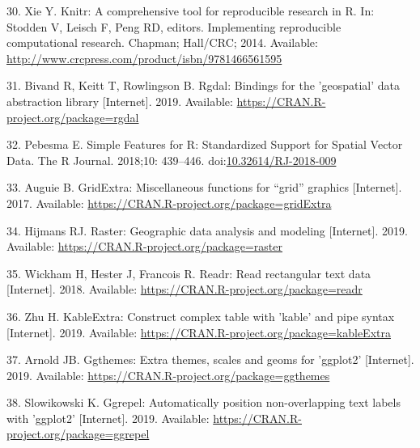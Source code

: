 \documentclass[10pt,letterpaper]{article}
\begin{document}
\hypertarget{ref-Xie2014knitr}{}
30. Xie Y. Knitr: A comprehensive tool for reproducible research in R.
In: Stodden V, Leisch F, Peng RD, editors. Implementing reproducible
computational research. Chapman; Hall/CRC; 2014. Available:
\url{http://www.crcpress.com/product/isbn/9781466561595}

\hypertarget{ref-Bivand2019rgdal}{}
31. Bivand R, Keitt T, Rowlingson B. Rgdal: Bindings for the
'geospatial' data abstraction library {[}Internet{]}. 2019. Available:
\url{https://CRAN.R-project.org/package=rgdal}

\hypertarget{ref-Pebesma2018sf}{}
32. Pebesma E. Simple Features for R: Standardized Support for Spatial
Vector Data. The R Journal. 2018;10: 439--446.
doi:\href{https://doi.org/10.32614/RJ-2018-009}{10.32614/RJ-2018-009}

\hypertarget{ref-Auguie2017grid}{}
33. Auguie B. GridExtra: Miscellaneous functions for ``grid'' graphics
{[}Internet{]}. 2017. Available:
\url{https://CRAN.R-project.org/package=gridExtra}

\hypertarget{ref-Hijmans2019raster}{}
34. Hijmans RJ. Raster: Geographic data analysis and modeling
{[}Internet{]}. 2019. Available:
\url{https://CRAN.R-project.org/package=raster}

\hypertarget{ref-Wickham2018readr}{}
35. Wickham H, Hester J, Francois R. Readr: Read rectangular text data
{[}Internet{]}. 2018. Available:
\url{https://CRAN.R-project.org/package=readr}

\hypertarget{ref-Zhu2019kable}{}
36. Zhu H. KableExtra: Construct complex table with 'kable' and pipe
syntax {[}Internet{]}. 2019. Available:
\url{https://CRAN.R-project.org/package=kableExtra}

\hypertarget{ref-Arnold2019ggthemes}{}
37. Arnold JB. Ggthemes: Extra themes, scales and geoms for 'ggplot2'
{[}Internet{]}. 2019. Available:
\url{https://CRAN.R-project.org/package=ggthemes}

\hypertarget{ref-Slowikowski2019ggrepel}{}
38. Slowikowski K. Ggrepel: Automatically position non-overlapping text
labels with 'ggplot2' {[}Internet{]}. 2019. Available:
\url{https://CRAN.R-project.org/package=ggrepel}

\nolinenumbers
\end{document}
